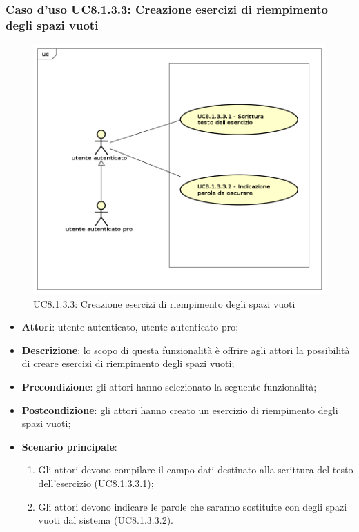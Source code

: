 \subsubsection{Caso d'uso UC8.1.3.3: Creazione esercizi di riempimento degli spazi vuoti}
	\label{UC8.1.3.3}
	\begin{figure}[h]
		\centering
			\includegraphics[scale=0.45,keepaspectratio]{UML/UC8_1_3_3.png}
		\caption{UC8.1.3.3: Creazione esercizi di riempimento degli spazi vuoti}
	\end{figure}
	\FloatBarrier
	\begin{itemize}
		\item
			\textbf{Attori}: utente autenticato, utente autenticato pro;
		\item		
			\textbf{Descrizione}: lo scopo di questa funzionalità è offrire agli attori la possibilità di creare esercizi di riempimento degli spazi vuoti;
		\item
			\textbf{Precondizione}: gli attori hanno selezionato la seguente funzionalità; 
		\item
			\textbf{Postcondizione}: gli attori hanno creato un esercizio di riempimento degli spazi vuoti;
		\item
			\textbf{Scenario principale}:
	       		\begin{enumerate}
	       			\item
	       			Gli attori devono compilare il campo dati destinato alla scrittura del testo dell'esercizio (UC8.1.3.3.1);
	       			\item
	       			Gli attori devono indicare le parole che saranno sostituite con degli spazi vuoti dal sistema (UC8.1.3.3.2).
	 			\end{enumerate}
	\end{itemize}
	

